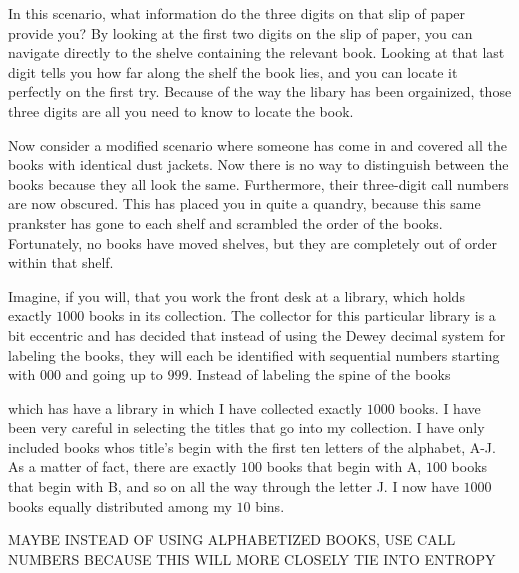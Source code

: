 \documentclass[11pt, oneside]{article}   	%
\begin{document}
In this scenario, what information do the three digits on that slip of paper
provide you?  By looking at the first two digits on the slip of paper, you can
navigate directly to the shelve containing the relevant book.  Looking at that
last digit tells you how far along the shelf the book lies, and you can locate
it perfectly on the first try.  Because of the way the libary has been
orgainized, those three digits are all you need to know to locate the book.


Now consider a modified scenario where someone has come in and covered all the
books with identical dust jackets.  Now there is no way to distinguish between
the books because they all look the same.  Furthermore, their three-digit call
numbers are now obscured.  This has placed you in quite a quandry, because this
same prankster has gone to each shelf and scrambled the order of the books.
Fortunately, no books have moved shelves, but they are completely out of order
within that shelf.





Imagine, if you will, that you work the front desk at a library, which holds
exactly $1000$ books in its collection.  The collector for this particular
library is a bit eccentric and has decided that instead of using the Dewey
decimal system for labeling the books, they will each be identified with
sequential numbers starting with $000$ and going up to $999$.  Instead of
labeling the spine of the books



which has have a library in which I have collected exactly
$1000$ books. I have been very careful in selecting the titles that go into my
collection. I have only included books whos title's begin with the first ten
letters of the alphabet, A-J. As a matter of fact, there are exactly $100$ books
that begin with A, $100$ books that begin with B, and so on all the way through
the letter J.  I now have $1000$ books equally distributed among my $10$ bins.

MAYBE INSTEAD OF USING ALPHABETIZED BOOKS, USE CALL NUMBERS BECAUSE THIS
WILL MORE CLOSELY TIE INTO ENTROPY
\end{document}
